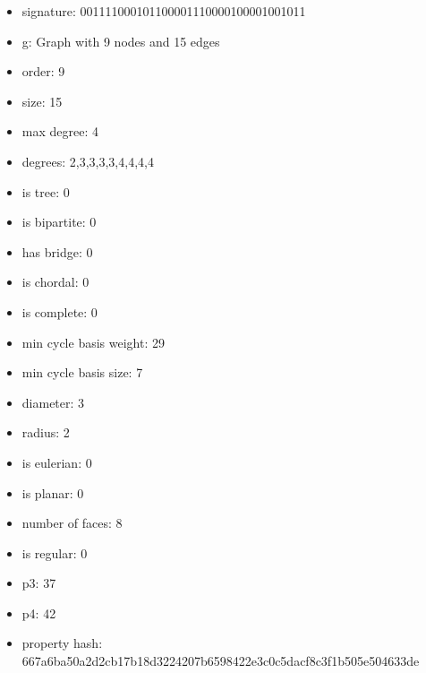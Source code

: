 \begin{figure}
\end{figure}
\begin{itemize}
\item signature: 001111000101100001110000100001001011
\item g: Graph with 9 nodes and 15 edges
\item order: 9
\item size: 15
\item max degree: 4
\item degrees: 2,3,3,3,3,4,4,4,4
\item is tree: 0
\item is bipartite: 0
\item has bridge: 0
\item is chordal: 0
\item is complete: 0
\item min cycle basis weight: 29
\item min cycle basis size: 7
\item diameter: 3
\item radius: 2
\item is eulerian: 0
\item is planar: 0
\item number of faces: 8
\item is regular: 0
\item p3: 37
\item p4: 42
\item property hash: 667a6ba50a2d2cb17b18d3224207b6598422e3c0c5dacf8c3f1b505e504633de
\end{itemize}
\newpage
